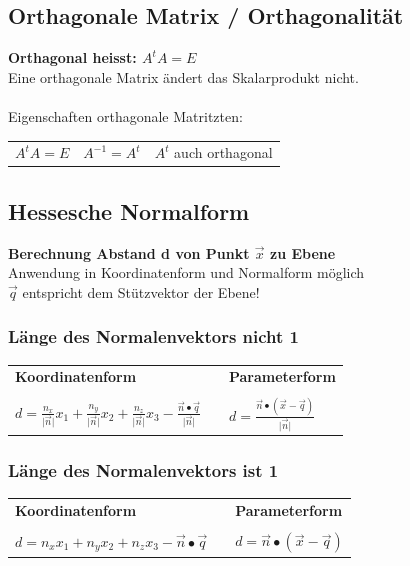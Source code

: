 			\subsection{Orthagonale Matrix / Orthagonalität}
			\textbf{Orthagonal heisst: $A^t A = E$}\\		
			Eine orthagonale Matrix ändert das Skalarprodukt nicht. \\
			\\
			Eigenschaften orthagonale Matritzten: \\
			\begin{tabular}{lll}
			$A^t A = E$ & $A^{-1} = A^t$ & $A^t$ auch orthagonal
			\end{tabular}
				
			
			\subsection{Hessesche Normalform}
			\textbf{Berechnung Abstand d von Punkt $\vec{x}$ zu Ebene}  \\
			Anwendung in Koordinatenform und Normalform möglich \\
			$\vec{q}$ entspricht dem Stützvektor der Ebene! 
			
			\subsubsection{Länge des Normalenvektors nicht 1}
			
			\begin{tabular}{lll}
			\textbf{Koordinatenform} & & \textbf{Parameterform} \\
			\\
			
			$d = \frac{n_x}{\vert \vec{n} \vert} x_1 + \frac{n_y}{\vert \vec{n} \vert} x_2 + \frac{n_z}{\vert \vec{n} \vert} x_3 - \frac{\vec{n} \bullet \vec{q}}{\vert \vec{n} \vert}$ & & $d = \frac{\vec{n} \bullet (\vec{x} - \vec{q})}{\vert \vec{n} \vert}$ \\
			\end{tabular}
			
			
			
			
			
			\subsubsection{Länge des Normalenvektors ist 1}
			
			\begin{tabular}{lll}
			\textbf{Koordinatenform} & & \textbf{Parameterform} \\
			\\
			
			$d = n_x x_1 + n_y x_2 + n_z x_3 - \vec{n} \bullet \vec{q}$ & & $d = \vec{n} \bullet (\vec{x} - \vec{q}) $
			\end{tabular}
				    
